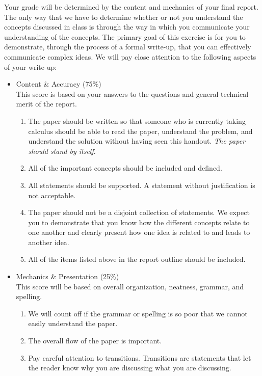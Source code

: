 Your grade will be determined by the content and mechanics of your
final report.  The only way that we have to determine
whether or not you understand the concepts discussed in class is
through the way in which you communicate your understanding of the
concepts. The primary goal of this exercise is for you to demonstrate,
through the process of a formal write-up, that you can effectively
communicate complex ideas. We will pay close attention to the
following aspects of your write-up:
\begin{itemize}
\item Content \& Accuracy (75\%) \\
    This score is based on your answers to the questions and general
    technical merit of the report.
    \begin{enumerate}
    \item The paper should be written so that someone who is
      currently taking calculus should be able to read the paper,
      understand the problem, and understand the solution
      without having seen this handout.
      {\em The paper should stand by itself}.
    \item All of the important concepts should be included and
      defined.
    \item All statements should be supported. A statement without
      justification is not acceptable.
    \item The paper should not be a disjoint collection of
      statements. We expect you to demonstrate that you know how the
      different concepts relate to one another and clearly present
      how one idea is related to and leads to another idea.
    \item All of the items listed above in the report outline should
      be included.
    \end{enumerate}

  \item Mechanics \& Presentation (25\%)  \\
    This score will be based on overall organization, neatness,
    grammar, and spelling.
    \begin{enumerate}
    \item We will count off if the grammar or spelling is so poor that
      we cannot easily understand the paper.
    \item The overall flow of the paper is important.
    \item Pay careful attention to transitions.  Transitions are
      statements that let the reader know why you are discussing what
      you are discussing.
    \end{enumerate}


\end{itemize}



